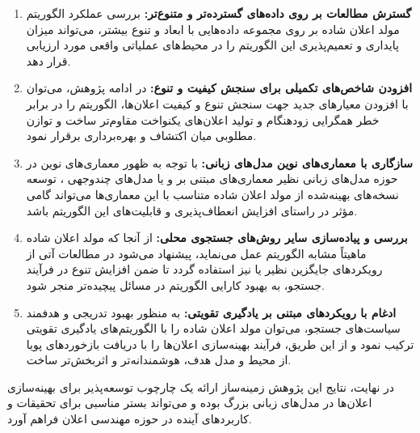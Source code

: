 \begin{enumerate}
	\item \textbf{گسترش مطالعات بر روی داده‌های گسترده‌تر و متنوع‌تر:} بررسی عملکرد الگوریتم مولد اعلان شاده بر روی مجموعه داده‌هایی با ابعاد و تنوع بیشتر، می‌تواند میزان پایداری و تعمیم‌پذیری این الگوریتم را در محیط‌های عملیاتی واقعی مورد ارزیابی قرار دهد.
	
	\item \textbf{افزودن شاخص‌های تکمیلی برای سنجش کیفیت و تنوع:} در ادامه پژوهش، می‌توان با افزودن معیارهای جدید جهت سنجش تنوع و کیفیت اعلان‌ها، الگوریتم را در برابر خطر همگرایی زودهنگام و تولید اعلان‌های یکنواخت مقاوم‌تر ساخت و توازن مطلوبی میان اکتشاف و بهره‌برداری برقرار نمود.
	
	\item \textbf{سازگاری با معماری‌های نوین مدل‌های زبانی:} با توجه به ظهور معماری‌های نوین در حوزه مدل‌های زبانی نظیر معماری‌های مبتنی بر 
	 و یا مدل‌های چندوجهی
	  ، توسعه نسخه‌های بهینه‌شده از مولد اعلان شاده متناسب با این معماری‌ها می‌تواند گامی مؤثر در راستای افزایش انعطاف‌پذیری و قابلیت‌های این الگوریتم باشد.
	
	\item \textbf{بررسی و پیاده‌سازی سایر روش‌های جستجوی محلی:} از آنجا که مولد اعلان شاده ماهیتاً مشابه الگوریتم  عمل می‌نماید، پیشنهاد می‌شود در مطالعات آتی از رویکردهای جایگزین نظیر  یا  نیز استفاده گردد تا ضمن افزایش تنوع در فرآیند جستجو، به بهبود کارایی الگوریتم در مسائل پیچیده‌تر منجر شود.
	
	\item \textbf{ادغام با رویکردهای مبتنی بر یادگیری تقویتی:} به منظور بهبود تدریجی و هدفمند سیاست‌های جستجو، می‌توان مولد اعلان شاده را با الگوریتم‌های یادگیری تقویتی ترکیب نمود و از این طریق، فرآیند بهینه‌سازی اعلان‌ها را با دریافت بازخوردهای پویا از محیط و مدل هدف، هوشمندانه‌تر و اثربخش‌تر ساخت.
\end{enumerate}

در نهایت، نتایج این پژوهش زمینه‌ساز ارائه یک چارچوب توسعه‌پذیر برای بهینه‌سازی اعلان‌ها در مدل‌های زبانی بزرگ بوده و می‌تواند بستر مناسبی برای تحقیقات و کاربردهای آینده در حوزه مهندسی اعلان فراهم آورد.
